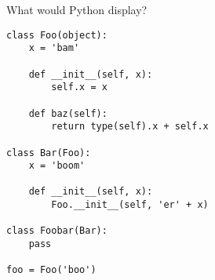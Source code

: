 \begin{blocksection}
\question What would Python display?

\begin{lstlisting}
class Foo(object):
    x = 'bam'

    def __init__(self, x):
        self.x = x

    def baz(self):
        return type(self).x + self.x

class Bar(Foo):
    x = 'boom'

    def __init__(self, x):
        Foo.__init__(self, 'er' + x)

class Foobar(Bar):
    pass

foo = Foo('boo')
\end{lstlisting}   

\end{blocksection}
